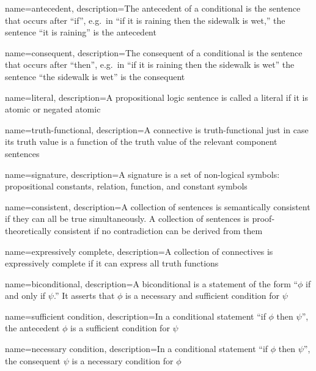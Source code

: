 \documentclass[fleqn]{tufte-book}
\numberwithin{prop}{chapter}
\theoremstyle{definition}
\numberwithin{exercise}{chapter}
\begin{document}
{
  name={antecedent},
  description={The antecedent of a conditional is the sentence that
    occurs after ``if'', e.g.\ in ``if it is raining then the sidewalk
    is wet,'' the sentence ``it is raining'' is the antecedent}}

{
  name={consequent},
  description={The consequent of a conditional is the sentence that
    occurs after ``then'', e.g.\ in ``if it is raining then the sidewalk is
    wet'' the sentence ``the sidewalk is wet'' is the consequent}}

{
  name={literal},
  description={A propositional logic sentence is called a literal if
    it is atomic or negated atomic}}

{
  name={truth-functional},
  description={A connective is truth-functional just in case its truth
    value is a function of the truth value of the relevant component
    sentences}}

{
  name={signature},
  description={A signature is a set of non-logical symbols:
    propositional constants, relation, function, and constant symbols}}

 { name={consistent}, description={A
    collection of sentences is semantically consistent if they can all
    be true simultaneously.  A collection of sentences is
    proof-theoretically consistent if no contradiction can be derived
    from them} }

 { name={expressively
    complete}, description={A collection of connectives is
    expressively complete if it can express all truth functions} }

 { name={biconditional},
  description={A biconditional is a statement of the form ``$\phi$ if
    and only if $\psi$.'' It asserts that $\phi$ is a necessary and
    sufficient condition for $\psi$} }

 { name={sufficient condition},
  description={In a conditional statement ``if $\phi$ then $\psi$'',
    the antecedent $\phi$ is a sufficient condition for $\psi$} }

 { name={necessary condition},
  description={In a conditional statement ``if $\phi$ then $\psi$'',
    the consequent $\psi$ is a necessary condition for $\phi$} }
\end{document}
